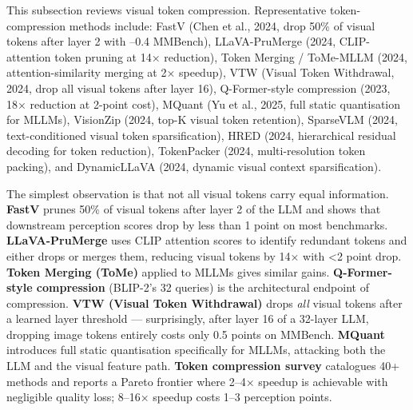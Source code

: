 \documentclass{article}
\begin{document}
This subsection reviews visual token compression. Representative token-compression methods include: FastV (Chen et al., 2024, drop 50\% of visual tokens after layer 2 with --0.4 MMBench), LLaVA-PruMerge (2024, CLIP-attention token pruning at 14× reduction), Token Merging / ToMe-MLLM (2024, attention-similarity merging at 2× speedup), VTW (Visual Token Withdrawal, 2024, drop all visual tokens after layer 16), Q-Former-style compression (2023, 18× reduction at 2-point cost), MQuant (Yu et al., 2025, full static quantisation for MLLMs), VisionZip (2024, top-K visual token retention), SparseVLM (2024, text-conditioned visual token sparsification), HRED (2024, hierarchical residual decoding for token reduction), TokenPacker (2024, multi-resolution token packing), and DynamicLLaVA (2024, dynamic visual context sparsification).

The simplest observation is that not all visual tokens carry equal information. \textbf{FastV} \citep{chen20242024} prunes 50\% of visual tokens after layer 2 of the LLM and shows that downstream perception scores drop by less than 1 point on most benchmarks. \textbf{LLaVA-PruMerge} uses CLIP attention scores to identify redundant tokens and either drops or merges them, reducing visual tokens by 14× with \textless2 point drop. \textbf{Token Merging (ToMe)} applied to MLLMs gives similar gains. \textbf{Q-Former-style compression} (BLIP-2's 32 queries) is the architectural endpoint of compression. \textbf{VTW (Visual Token Withdrawal)} drops \emph{all} visual tokens after a learned layer threshold --- surprisingly, after layer 16 of a 32-layer LLM, dropping image tokens entirely costs only 0.5 points on MMBench. \textbf{MQuant} \citep{yu20252025} introduces full static quantisation specifically for MLLMs, attacking both the LLM and the visual feature path. \textbf{Token compression survey} \citep{shao20262026} catalogues 40+ methods and reports a Pareto frontier where 2--4× speedup is achievable with negligible quality loss; 8--16× speedup costs 1--3 perception points.
\end{document}
